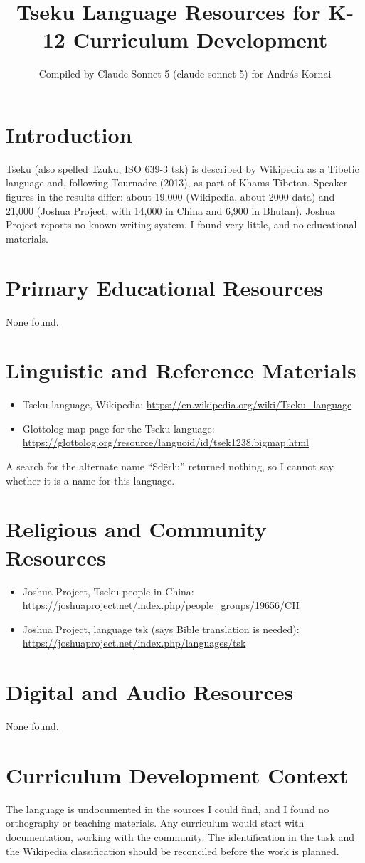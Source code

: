 \documentclass[12pt]{article}
\title{Tseku Language Resources for K-12 Curriculum Development}
\author{Compiled by Claude Sonnet 5 (claude-sonnet-5) for Andr\'as Kornai}
\date{}
\begin{document}
\maketitle

\section{Introduction}
Tseku (also spelled Tzuku, ISO 639-3 tsk) is described by Wikipedia as a Tibetic language and, following Tournadre (2013), as part of Khams Tibetan. Speaker figures in the results differ: about 19,000 (Wikipedia, about 2000 data) and 21,000 (Joshua Project, with 14,000 in China and 6,900 in Bhutan). Joshua Project reports no known writing system. I found very little, and no educational materials.

\section{Primary Educational Resources}
None found.

\section{Linguistic and Reference Materials}
\begin{itemize}
\item Tseku language, Wikipedia: \url{https://en.wikipedia.org/wiki/Tseku_language}
\item Glottolog map page for the Tseku language: \url{https://glottolog.org/resource/languoid/id/tsek1238.bigmap.html}
\end{itemize}
A search for the alternate name ``Sd\"erlu'' returned nothing, so I cannot say whether it is a name for this language.

\section{Religious and Community Resources}
\begin{itemize}
\item Joshua Project, Tseku people in China: \url{https://joshuaproject.net/index.php/people_groups/19656/CH}
\item Joshua Project, language tsk (says Bible translation is needed): \url{https://joshuaproject.net/index.php/languages/tsk}
\end{itemize}

\section{Digital and Audio Resources}
None found.

\section{Curriculum Development Context}
The language is undocumented in the sources I could find, and I found no orthography or teaching materials. Any curriculum would start with documentation, working with the community. The identification in the task and the Wikipedia classification should be reconciled before the work is planned.
\end{document}
